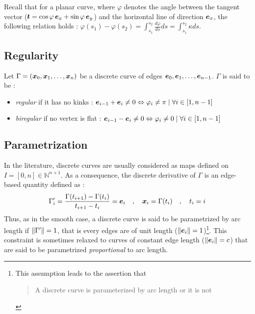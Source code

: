 Recall that for a planar curve, where $\varphi$ denotes the angle between the tangent vector ($\boldsymbol{t} = \cos\varphi \,\boldsymbol{e}_x + \sin\varphi \,\boldsymbol{e}_y$) and the horizontal line of direction $\boldsymbol{e}_x$, the following relation holds : $\varphi(s_1) - \varphi(s_2) = \int_{s_1}^{s_2} \frac{d \varphi}{d s} ds = \int_{s_1}^{s_2} \kappa ds$.

\subsection{Regularity}

Let $\Gamma = (\boldsymbol{x}_0,  \boldsymbol{x}_1, \ldots, \boldsymbol{x}_n)$ be a discrete curve of edges $\boldsymbol{e}_0,  \boldsymbol{e}_1, \ldots, \boldsymbol{e}_{n-1}$. $\Gamma$ is said to be :
\begin{itemize}
	\item  \emph{regular} if it has no kinks : $\boldsymbol{e}_{i-1} + \boldsymbol{e}_{i} \neq 0 \Leftrightarrow \varphi_i \neq \pi \; | \; \forall i \in [1,n-1] $
	\item  \emph{biregular} if no vertex is flat : $\boldsymbol{e}_{i-1} - \boldsymbol{e}_{i} \neq 0 \Leftrightarrow \varphi_i \neq 0 \; | \; \forall i \in [1,n-1] $
\end{itemize}

\subsection{Parametrization}

In the literature, discrete curves are usually considered as maps defined on $I = [0,n] \in \mathbb{N}^{n+1}$. As a consequence, the discrete derivative of $\Gamma$ is an edge-based quantity defined as : 
\begin{equation}
	\Gamma'_i = \frac{ \Gamma(t_{i+1}) -  \Gamma(t_i)}{t_{i+1} - t_i} = \boldsymbol{e}_i 
	\quad , \quad
	\boldsymbol{x}_{i} = \Gamma(t_i)
	\quad , \quad
	t_i = i
\end{equation}
Thus, as in the smooth case, a discrete curve is said to be parametrized by arc length if $\lVert\Gamma'\rVert = 1$, that is every edges are of unit length ($\lVert\boldsymbol{e}_i\rVert = 1$)\footnote{This assumption leads to the assertion that \blockcquote[p.10]{Hoffmann2008}{A discrete curve is parameterized by arc length or it is not}.}. This constraint is sometimes relaxed to curves of constant edge length ($\lVert\boldsymbol{e}_i\rVert = c$) that are said to be parametrized \emph{proportional} to arc length.

